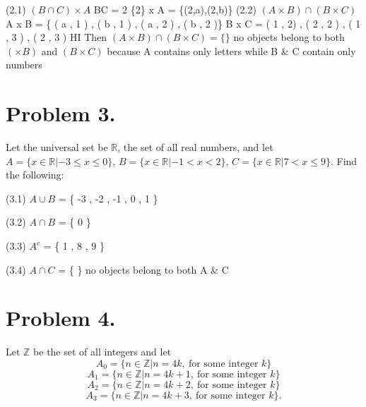 \documentclass[11pt]{article}
\begin{document}
\noindent
(2.1) $(B\cap C)\times A$
\newline
\newline
B\cap C = {2}
\newline
\{2\} x A = \{(2,a),(2,b)\}
\noindent
\newline
\newline
(2.2) $(A\times B)\cap (B\times C)$
\newline
\newline
A x B = \{ ( a , 1 ) , ( b , 1 ) , ( a , 2 ) , ( b , 2 )\}
\newline
B x C = { ( 1 , 2) , ( 2 , 2 ) , ( 1 , 3 ) , ( 2 , 3 )}
HI
\newline
Then $(A\times B)\cap (B\times C ) = \{\}$ no objects belong to both $(\times B)$ and $( B \times C)$ because A contains only letters while B \& C contain only numbers
\newline
\newpage

\section*{Problem 3.}

Let the universal set be $\mathbb{R}$, the set of all real numbers, and let
$A=\{x\in\mathbb{R}|-3\leq x\leq 0\}$, $B=\{x\in\mathbb{R}|-1<x<2\}$, 
$C=\{x\in\mathbb{R}|7<x\leq 9\}$. Find the following:
\newline

\noindent
(3.1) $A\cup B$
 = \{ -3 , -2 , -1 , 0 , 1 \}
\newline

\noindent
(3.2) $A\cap B$
 = \{ 0 \}
\newline

\noindent
(3.3) $A^c$
 = \{ 1 , 8 , 9 \}
\newline

\noindent
(3.4) $A\cap C$
 = \{ \} no objects belong to both A \& C
\newline

\newpage

\section*{Problem 4.}

Let $\mathbb{Z}$ be the set of all integers and let
$$A_0=\{n\in \mathbb{Z}| n=4k,~\mbox{for~some~integer~$k$}\}$$
$$A_1=\{n\in \mathbb{Z}| n=4k+1,~\mbox{for~some~integer~$k$}\}$$
$$A_2=\{n\in \mathbb{Z}| n=4k+2,~\mbox{for~some~integer~$k$}\}$$
$$A_3=\{n\in \mathbb{Z}| n=4k+3,~\mbox{for~some~integer~$k$}\}.$$
\end{document}
